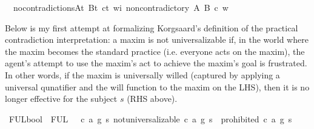 \begin{isabellebody}
%
\isanewline
\isanewline
{}\isamarkupfalse%
\ \ no{\isacharunderscore}contradictions{\isacharcolon}{\isachardoublequoteopen}{\isasymforall}A{\isacharcolon}{\isacharcolon}t{\isachardot}\ {\isasymforall}B{\isacharcolon}{\isacharcolon}t{\isachardot}\ {\isasymforall}c{\isacharcolon}{\isacharcolon}t{\isachardot}\ {\isasymforall}w{\isacharcolon}{\isacharcolon}i{\isachardot}\ non{\isacharunderscore}contradictory\ A\ B\ c\ w{\isachardoublequoteclose}\isanewline
%
%
\isadelimdocument
%
\endisadelimdocument
%
\isatagdocument
%
\isamarkuptrue%
%
\endisatagdocument
{\isafolddocument}%
%
\isadelimdocument
%
\endisadelimdocument
%
\begin{isamarkuptext}%
Below is my first attempt at formalizing Korgsaard's definition of the practical contradiction
interpretation:  a maxim is not universalizable 
if, in the world where the maxim becomes the standard practice (i.e. everyone acts on the maxim), the
agent's attempt to use the maxim's act to achieve the maxim's goal is frustrated. In other words, if 
the maxim is universally willed (captured by applying a universal qunatifier and the will function 
to the maxim on the LHS), then it is no longer effective for the subject $s$ (RHS above).%
\end{isamarkuptext}\isamarkuptrue%
\isamarkupfalse%
\ FUL{}{\isacharcolon}{\isacharcolon}bool\ \ {\isachardoublequoteopen}FUL{}\ {\isasymequiv}\ {\isasymforall}\ c\ a\ g\ s{\isachardot}\ not{\isacharunderscore}universalizable\ {\isacharparenleft}c{\isacharcomma}\ a{\isacharcomma}\ g{\isacharparenright}\ s\ {\isasymlongrightarrow}\ {\isasymTurnstile}{\isacharparenleft}{\isacharparenleft}prohibited\ {\isacharparenleft}c{\isacharcomma}\ a{\isacharcomma}\ g{\isacharparenright}\ s{\isacharparenright}{\isacharparenright}{\isachardoublequoteclose}\isanewline
%
\end{isabellebody}
